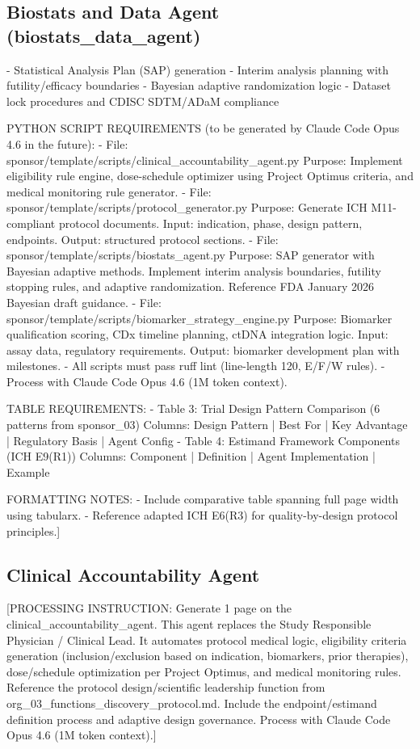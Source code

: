 \subsection{Biostats and Data Agent (biostats\_data\_agent)}
- Statistical Analysis Plan (SAP) generation
- Interim analysis planning with futility/efficacy boundaries
- Bayesian adaptive randomization logic
- Dataset lock procedures and CDISC SDTM/ADaM compliance

PYTHON SCRIPT REQUIREMENTS (to be generated by Claude Code Opus 4.6 in the future):
- File: sponsor/template/scripts/clinical\_accountability\_agent.py
  Purpose: Implement eligibility rule engine, dose-schedule optimizer using
  Project Optimus criteria, and medical monitoring rule generator.
- File: sponsor/template/scripts/protocol\_generator.py
  Purpose: Generate ICH M11-compliant protocol documents. Input: indication,
  phase, design pattern, endpoints. Output: structured protocol sections.
- File: sponsor/template/scripts/biostats\_agent.py
  Purpose: SAP generator with Bayesian adaptive methods. Implement interim
  analysis boundaries, futility stopping rules, and adaptive randomization.
  Reference FDA January 2026 Bayesian draft guidance.
- File: sponsor/template/scripts/biomarker\_strategy\_engine.py
  Purpose: Biomarker qualification scoring, CDx timeline planning, ctDNA
  integration logic. Input: assay data, regulatory requirements. Output:
  biomarker development plan with milestones.
- All scripts must pass ruff lint (line-length 120, E/F/W rules).
- Process with Claude Code Opus 4.6 (1M token context).

TABLE REQUIREMENTS:
- Table 3: Trial Design Pattern Comparison (6 patterns from sponsor\_03)
  Columns: Design Pattern | Best For | Key Advantage | Regulatory Basis | Agent Config
- Table 4: Estimand Framework Components (ICH E9(R1))
  Columns: Component | Definition | Agent Implementation | Example

FORMATTING NOTES:
- Include comparative table spanning full page width using tabularx.
- Reference adapted ICH E6(R3) for quality-by-design protocol principles.]

\subsection{Clinical Accountability Agent}

[PROCESSING INSTRUCTION: Generate 1 page on the clinical\_accountability\_agent. This agent
replaces the Study Responsible Physician / Clinical Lead. It automates protocol medical
logic, eligibility criteria generation (inclusion/exclusion based on indication, biomarkers,
prior therapies), dose/schedule optimization per Project Optimus, and medical monitoring
rules. Reference the protocol design/scientific leadership function from
org\_03\_functions\_discovery\_protocol.md. Include the endpoint/estimand definition process
and adaptive design governance. Process with Claude Code Opus 4.6 (1M token context).]

